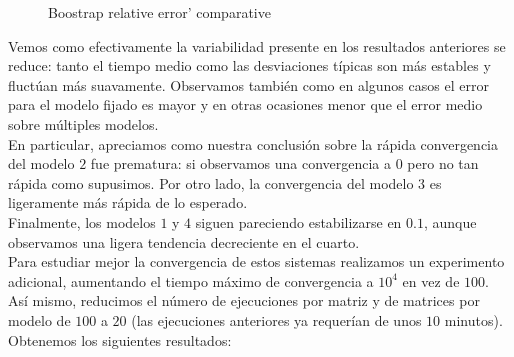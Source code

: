 \documentclass[a4paper]{article}
\begin{document}
\begin{figure}[H]
	\centering
	\caption{Boostrap relative error' comparative}
\end{figure}

Vemos como efectivamente la variabilidad presente en los resultados anteriores se reduce: tanto el tiempo medio como las desviaciones típicas son más estables y fluctúan más suavamente. Observamos también como en algunos casos el error para el modelo fijado es mayor y en otras ocasiones menor que el error medio sobre múltiples modelos. \\

En particular, apreciamos como nuestra conclusión sobre la rápida convergencia del modelo $2$ fue prematura: si observamos una convergencia a $0$ pero no tan rápida como supusimos. Por otro lado, la convergencia del modelo $3$ es ligeramente más rápida de lo esperado. \\

Finalmente, los modelos $1$ y $4$ siguen pareciendo estabilizarse en $0.1$, aunque observamos una ligera tendencia decreciente en el cuarto. \\

Para estudiar mejor la convergencia de estos sistemas realizamos un experimento adicional, aumentando el tiempo máximo de convergencia a $10^4$ en vez de $100$. Así mismo, reducimos el número de ejecuciones por matriz y de matrices por modelo de $100$ a $20$ (las ejecuciones anteriores ya requerían de unos $10$ minutos). Obtenemos los siguientes resultados:
\end{document}
